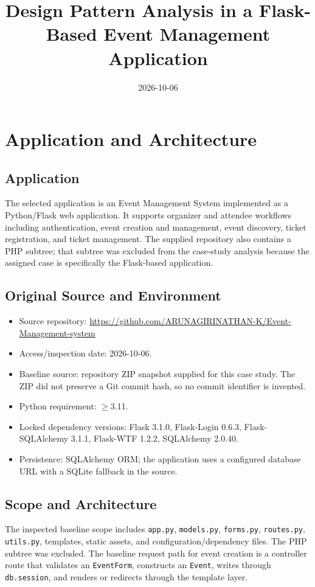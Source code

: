 \documentclass[11pt,a4paper]{article}
\title{\textbf{Design Pattern Analysis in a Flask-Based Event Management Application}}
\author{Team A15\[2mm]
Harshitha D --- AM.SC.U4CSE23222\\
T Heshaja --- AM.SC.U4CSE23265}
\date{2026-10-06}
\begin{document}
\maketitle
\tableofcontents
\newpage

\section{Application and Architecture}
\subsection{Application}
The selected application is an Event Management System implemented as a Python/Flask web application. It supports organizer and attendee workflows including authentication, event creation and management, event discovery, ticket registration, and ticket management. The supplied repository also contains a PHP subtree; that subtree was excluded from the case-study analysis because the assigned case is specifically the Flask-based application.

\subsection{Original Source and Environment}
\begin{itemize}
\item Source repository: \url{https://github.com/ARUNAGIRINATHAN-K/Event-Management-system}
\item Access/inspection date: 2026-10-06.
\item Baseline source: repository ZIP snapshot supplied for this case study. The ZIP did not preserve a Git commit hash, so no commit identifier is invented.
\item Python requirement: $\geq$3.11.
\item Locked dependency versions: Flask 3.1.0, Flask-Login 0.6.3, Flask-SQLAlchemy 3.1.1, Flask-WTF 1.2.2, SQLAlchemy 2.0.40.
\item Persistence: SQLAlchemy ORM; the application uses a configured database URL with a SQLite fallback in the source.
\end{itemize}

\subsection{Scope and Architecture}
The inspected baseline scope includes \texttt{app.py}, \texttt{models.py}, \texttt{forms.py}, \texttt{routes.py}, \texttt{utils.py}, templates, static assets, and configuration/dependency files. The PHP subtree was excluded. The baseline request path for event creation is a controller route that validates an \texttt{EventForm}, constructs an \texttt{Event}, writes through \texttt{db.session}, and renders or redirects through the template layer.
\end{document}

